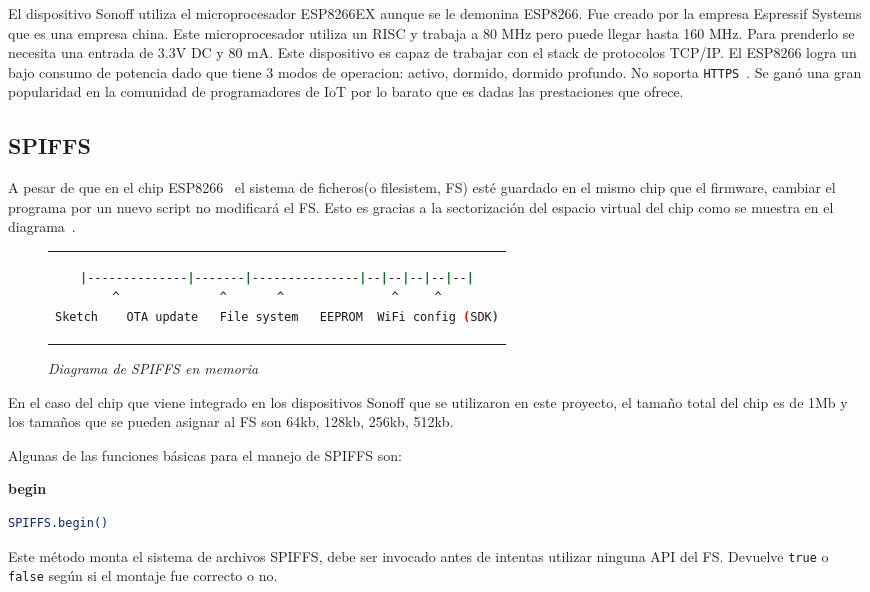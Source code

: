 El dispositivo Sonoff utiliza el microprocesador ESP8266EX aunque se le demonina ESP8266. Fue creado por la empresa Espressif Systems que es una empresa china. Este microprocesador utiliza un RISC y trabaja a  80 MHz pero puede llegar hasta 160 MHz. Para prenderlo se necesita una entrada de 3.3V DC y 80 mA. Este dispositivo es capaz de trabajar con el stack de protocolos TCP/IP. El ESP8266 logra un bajo consumo de potencia dado que tiene 3 modos de operacion: activo, dormido, dormido profundo. No soporta \lstinline[columns=fixed]{HTTPS}~\cite{HTTPS}. Se ganó una gran popularidad en la comunidad de programadores de IoT por lo barato que es dadas las prestaciones que ofrece. 

\subsection{SPIFFS} \label{sec-SPIFFS}

A pesar de que en el chip ESP8266~\cite{esp8266} el sistema de ficheros(o filesistem, FS) esté guardado en el mismo chip que el firmware, cambiar el programa por un nuevo script no modificará el FS. Esto es gracias a la sectorización del espacio virtual del chip como se muestra en el diagrama~.

\begin{figure}[thp]
\centering
\begin{tabular}{c}
\begin{lstlisting}[language=bash]
|--------------|-------|---------------|--|--|--|--|--|
^              ^       ^               ^     ^
Sketch    OTA update   File system   EEPROM  WiFi config (SDK)
\end{lstlisting}
\end{tabular}
\caption{\textit{Diagrama de SPIFFS en memoria}}
\label{lst:SPIFFS}
\end{figure}

En el caso del chip que viene integrado en los dispositivos Sonoff que se utilizaron en este proyecto, el tamaño total del chip es de 1Mb y los tamaños que se pueden asignar al FS son 64kb, 128kb, 256kb, 512kb.

Algunas de las funciones básicas para el manejo de SPIFFS son:

\textbf{begin}
\begin{lstlisting}[language=bash]
SPIFFS.begin()
\end{lstlisting}
Este método monta el sistema de archivos SPIFFS, debe ser invocado antes de intentas utilizar ninguna API del FS. Devuelve \lstinline[columns=fixed]{true} o \lstinline[columns=fixed]{false} según si el montaje fue correcto o no.

